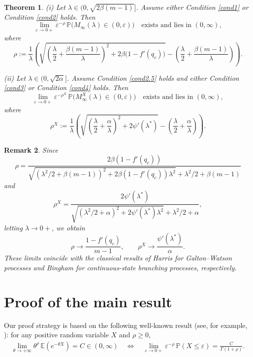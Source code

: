 \documentclass[10pt,a4paper]{amsart}
\newtheorem{thrm}{Theorem}[section]
\newtheorem{remark}[thrm]{Remark}
\numberwithin{equation}{section}
\begin{document}
\begin{thrm}\label{main result}
(i) Let $\lambda \in (0, \sqrt{2\beta(m-1)}]$. Assume either Condition \ref{cond1} or Condition \ref{cond2} holds. Then
\[
\lim_{\varepsilon \to 0+} \varepsilon^{-\rho} \, \mathbb{P}\bigl( M_\infty(\lambda) \in (0, \varepsilon) \bigr) \quad \text{exists and lies in } (0, \infty),
\]
where
\[
\rho := \frac{1}{\lambda} \left( \sqrt{ \left( \frac{\lambda}{2} + \frac{\beta(m-1)}{\lambda} \right)^2 + 2\beta \bigl(1 - f'(q_c)\bigr) } - \left( \frac{\lambda}{2} + \frac{\beta(m-1)}{\lambda} \right) \right).
\]

(ii) Let $\lambda \in (0, \sqrt{2\alpha}]$. Assume Condition \ref{cond2.5} holds and either Condition \ref{cond3} or Condition \ref{cond4} holds. Then
\[
\lim_{\varepsilon \to 0+} \varepsilon^{-\rho^X} \, \mathbb{P}\bigl( M_\infty^X(\lambda) \in (0, \varepsilon) \bigr) \quad \text{exists and lies in } (0, \infty),
\]
where
\[
\rho^X := \frac{1}{\lambda} \left( \sqrt{ \left( \frac{\lambda}{2} + \frac{\alpha}{\lambda} \right)^2 + 2 \psi'(\lambda^*) } - \left( \frac{\lambda}{2} + \frac{\alpha}{\lambda} \right) \right).
\]	
\end{thrm}




\begin{remark}
Since
\[
\rho = \frac{2\beta (1 - f'(q_c))}{
	\sqrt{ (\lambda^2/2 + \beta(m-1))^2 + 2\beta (1 - f'(q_c)) \lambda^2 } + \lambda^2/2 + \beta(m-1)
}
\]
and
\[
\rho^X = \frac{2 \psi'(\lambda^*)}{
	\sqrt{ (\lambda^2/2 + \alpha)^2 + 2 \psi'(\lambda^*) \lambda^2 } + \lambda^2/2 + \alpha},
\]
letting $\lambda \to 0+$, we obtain
\[
\rho \to \frac{1 - f'(q_c)}{m - 1}, \qquad
\rho^X \to \frac{\psi'(\lambda^*)}{\alpha}.
\]
These limits coincide with the classical results of Harris \cite{Harris1963} for Galton--Watson processes and Bingham \cite{Bingham} for continuous-state branching processes, respectively.	
\end{remark}




\section{Proof of the main result}

Our proof strategy is based on the following well-known result (see, for example, \cite[Theorem 1.7.1', p.~38]{BGT}): for any positive random variable $X$ and $\rho \geq 0$,
\begin{align}\label{Lap-small}
	\lim_{\theta \to +\infty} \theta^\rho \, \mathbb{E}(e^{-\theta X}) = C \in (0, \infty) 
	\quad \Longleftrightarrow \quad
	\lim_{\varepsilon \to 0+} \varepsilon^{-\rho} \, \mathbb{P}(X \leq \varepsilon) = \frac{C}{\Gamma(1+\rho)}.
\end{align}
\end{document}
